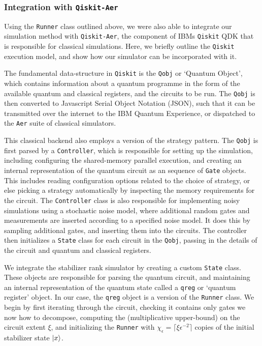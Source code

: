\subsubsection*{Integration with \texttt{Qiskit-Aer}}
Using the \texttt{Runner} class outlined above, we were also able to integrate our simulation method with \texttt{Qiskit-Aer}, the component of IBMs \texttt{Qiskit} QDK that is responsible for classical simulations. Here, we briefly outline the \texttt{Qiskit} execution model, and show how our simulator can be incorporated with it.\par
The fundamental data-structure in \texttt{Qiskit} is the \texttt{Qobj} or `Quantum Object', which contains information about a quantum programme in the form of the available quantum and classical registers, and the circuits to be run. The \texttt{Qobj} is then converted to Javascript Serial Object Notation (JSON), such that it can be transmitted over the internet to the IBM Quantum Experience, or dispatched to the \texttt{Aer} suite of classical simulators.\par 
This classical backend also employs a version of the strategy pattern. The \texttt{Qobj} is first parsed by a \texttt{Controller}, which is responsible for setting up the simulation, including configuring the shared-memory parallel execution, and creating an internal representation of the quantum circuit as an sequence of \texttt{Gate} objects. This includes reading configuration options related to the choice of strategy, or else picking a strategy automatically by inspecting the memory requirements for the circuit. The \texttt{Controller} class is also responsible for implementing noisy simulations using a stochastic noise model, where additional random gates and measurements are inserted according to a specified noise model. It does this by sampling additional gates, and inserting them into the circuits. The controller then initializes a \texttt{State} class for each circuit in the \texttt{Qobj}, passing in the details of the circuit and quantum and classical registers. \par
We integrate the stabilizer rank simulator by creating a custom \texttt{State} class. These objects are responsible for parsing the quantum circuit, and maintaining an internal representation of the quantum state called a \texttt{qreg} or `quantum register' object. In our case, the \texttt{qreg} object is a version of the \texttt{Runner} class. We begin by first iterating through the circuit, checking it contains only gates we now how to decompose, computing the (multiplicative upper-bound) on the circuit extent $\xi$, and initializing the \texttt{Runner} with $\chi_{\epsilon}=\lceil \xi \epsilon^{-2}\rceil$ copies of the initial stabilizer state $\ket{x}$.\par
